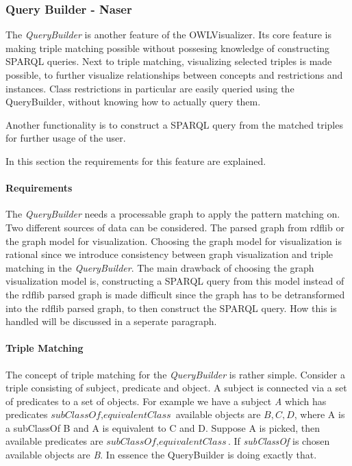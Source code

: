 \subsubsection{Query Builder - Naser}
The \textit{QueryBuilder} is another feature of the OWLVisualizer. Its core feature is making triple matching possible without possesing knowledge of  
constructing SPARQL queries. Next to triple matching, visualizing selected triples is made possible, to further visualize relationships between concepts and restrictions
and instances. 
Class restrictions in particular are easily queried using the QueryBuilder, without knowing how to actually query them. 

Another functionality is to construct a SPARQL query from the matched triples for further usage of the user. 

In this section the requirements for this feature are explained.

\paragraph{Requirements}

The \textit{QueryBuilder} needs a processable graph to apply the pattern matching on. 
Two different sources of data can be considered. The parsed graph from rdflib or the graph model for visualization.
Choosing the graph model for visualization is rational since we introduce consistency between graph visualization and
triple matching in the \textit{QueryBuilder}. The main drawback of choosing the graph visualization model is, constructing a
SPARQL query from this model instead of the rdflib parsed graph is made difficult since the graph has to be detransformed into the rdflib parsed graph, to then construct the 
SPARQL query. How this is handled will be discussed in a seperate paragraph. 


\paragraph{Triple Matching}
The concept of triple matching for the \textit{QueryBuilder} is rather simple.
Consider a triple consisting of subject, predicate and object.
A subject is connected via a set of predicates to a set of objects. 
For example we have a subject \textit{A} which has predicates ${\textit{subClassOf}, \textit{equivalentClass}}$
available objects are ${\textit{B}, \textit{C}, \textit{D}}$, where A is a subClassOf B and A is equivalent to C and D. 
Suppose A is picked, then available predicates are ${\textit{subClassOf}, \textit{equivalentClass}}$.
If \textit{subClassOf} is chosen available objects are \textit{B}.
In essence the QueryBuilder is doing exactly that.



